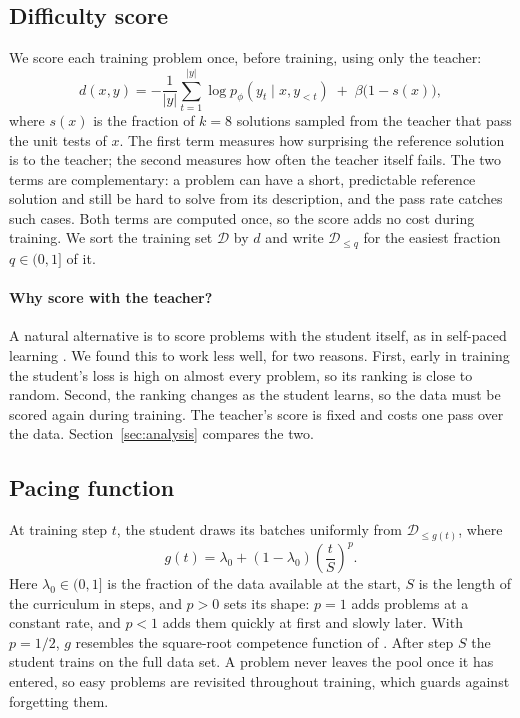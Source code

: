 \documentclass{article} %
\begin{document}
\subsection{Difficulty score}
\label{sec:score}

We score each training problem once, before training, using only the teacher:
\begin{equation}
d(x, y) = -\frac{1}{|y|} \sum_{t=1}^{|y|} \log p_\phi(y_t \mid x, y_{<t}) \;+\; \beta \bigl(1 - s(x)\bigr),
\label{eq:difficulty}
\end{equation}
where $s(x)$ is the fraction of $k = 8$ solutions sampled from the teacher that pass the unit tests of $x$.
The first term measures how surprising the reference solution is to the teacher; the second measures how often the teacher itself fails.
The two terms are complementary: a problem can have a short, predictable reference solution and still be hard to solve from its description, and the pass rate catches such cases.
Both terms are computed once, so the score adds no cost during training.
We sort the training set $\mathcal{D}$ by $d$ and write $\mathcal{D}_{\le q}$ for the easiest fraction $q \in (0, 1]$ of it.

\paragraph{Why score with the teacher?}
A natural alternative is to score problems with the student itself, as in self-paced learning \citep{kumar2010selfpaced}.
We found this to work less well, for two reasons.
First, early in training the student's loss is high on almost every problem, so its ranking is close to random.
Second, the ranking changes as the student learns, so the data must be scored again during training.
The teacher's score is fixed and costs one pass over the data.
Section~\ref{sec:analysis} compares the two.

\subsection{Pacing function}
\label{sec:pacing}

At training step $t$, the student draws its batches uniformly from $\mathcal{D}_{\le g(t)}$, where
\begin{equation}
g(t) = \lambda_0 + (1 - \lambda_0) \left( \frac{t}{S} \right)^{p}.
\label{eq:pacing}
\end{equation}
Here $\lambda_0 \in (0, 1]$ is the fraction of the data available at the start, $S$ is the length of the curriculum in steps, and $p > 0$ sets its shape: $p = 1$ adds problems at a constant rate, and $p < 1$ adds them quickly at first and slowly later.
With $p = 1/2$, $g$ resembles the square-root competence function of \citet{platanios2019competence}.
After step $S$ the student trains on the full data set.
A problem never leaves the pool once it has entered, so easy problems are revisited throughout training, which guards against forgetting them.
\end{document}
